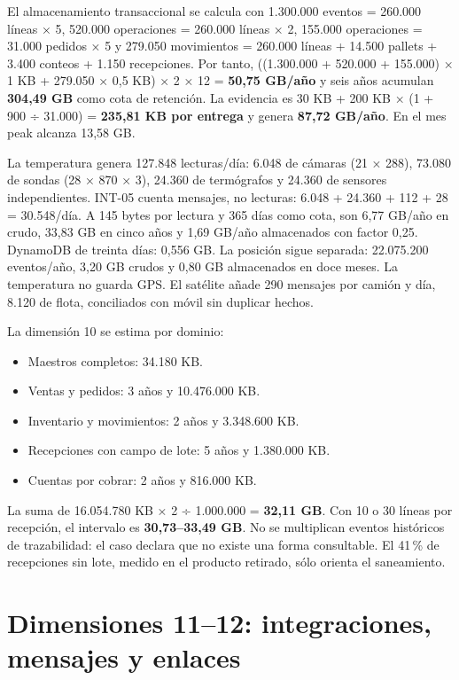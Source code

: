 El almacenamiento transaccional se calcula con 1.300.000 eventos = 260.000 líneas × 5, 520.000 operaciones = 260.000 líneas × 2, 155.000 operaciones = 31.000 pedidos × 5 y 279.050 movimientos = 260.000 líneas + 14.500 pallets + 3.400 conteos + 1.150 recepciones. Por tanto, ((1.300.000 + 520.000 + 155.000) × 1 KB + 279.050 × 0,5 KB) × 2 × 12 = \textbf{50,75 GB/año} y seis años acumulan \textbf{304,49 GB} como cota de retención. La evidencia es 30 KB + 200 KB × (1 + 900 ÷ 31.000) = \textbf{235,81 KB por entrega} y genera \textbf{87,72 GB/año}. En el mes peak alcanza 13,58 GB.

La temperatura genera 127.848 lecturas/día: 6.048 de cámaras (21 × 288), 73.080 de sondas (28 × 870 × 3), 24.360 de termógrafos y 24.360 de sensores independientes. INT-05 cuenta mensajes, no lecturas: 6.048 + 24.360 + 112 + 28 = 30.548/día. A 145 bytes por lectura y 365 días como cota, son 6,77 GB/año en crudo, 33,83 GB en cinco años y 1,69 GB/año almacenados con factor 0,25. DynamoDB de treinta días: 0,556 GB. La posición sigue separada: 22.075.200 eventos/año, 3,20 GB crudos y 0,80 GB almacenados en doce meses. La temperatura no guarda GPS. El satélite añade 290 mensajes por camión y día, 8.120 de flota, conciliados con móvil sin duplicar hechos.

La dimensión 10 se estima por dominio:

\begin{itemize}
  \item Maestros completos: 34.180 KB.
  \item Ventas y pedidos: 3 años y 10.476.000 KB.
  \item Inventario y movimientos: 2 años y 3.348.600 KB.
  \item Recepciones con campo de lote: 5 años y 1.380.000 KB.
  \item Cuentas por cobrar: 2 años y 816.000 KB.
\end{itemize}

La suma de 16.054.780 KB × 2 ÷ 1.000.000 = \textbf{32,11 GB}. Con 10 o 30 líneas por recepción, el intervalo es \textbf{30,73–33,49 GB}. No se multiplican eventos históricos de trazabilidad: el caso declara que no existe una forma consultable. El 41\,\% de recepciones sin lote, medido en el producto retirado, sólo orienta el saneamiento.

\section{Dimensiones 11–12: integraciones, mensajes y enlaces}
\label{sec:anexo-4b-dimensiones-11-12}


